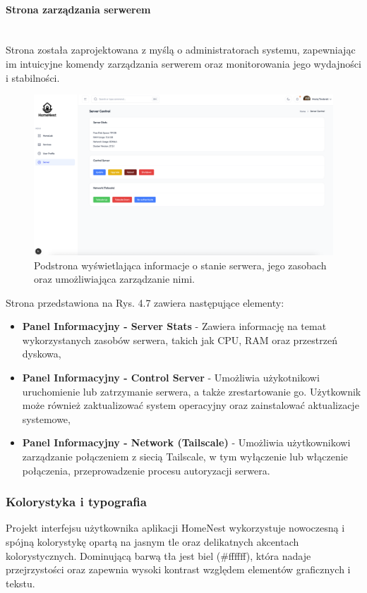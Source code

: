 \paragraph{Strona zarządzania serwerem}\mbox{}\\

Strona została zaprojektowana z myślą o administratorach systemu, zapewniając im intuicyjne komendy zarządzania serwerem oraz monitorowania jego wydajności i stabilności.

\begin{figure}[H]
  \centering
  \includegraphics[width=1\textwidth]{./chapters/assets/server_page.png}
  \caption{Podstrona wyświetlająca informacje o stanie serwera, jego zasobach oraz umożliwiająca zarządzanie nimi.}
  \label{fig:ui_server_page}
\end{figure}
\noindent Strona przedstawiona na Rys. 4.7 zawiera następujące elementy:
\begin{itemize}
  \item \textbf{Panel Informacyjny -  Server Stats} - Zawiera informację na temat wykorzystanych zasobów serwera, takich jak CPU, RAM oraz przestrzeń dyskowa,
  \item \textbf{Panel Informacyjny -  Control Server} - Umożliwia użykotnikowi uruchomienie lub zatrzymanie serwera, a także zrestartowanie go. Użytkownik może również zaktualizować system operacyjny oraz zainstalować aktualizacje systemowe,
  \item \textbf{Panel Informacyjny -  Network (Tailscale\cite{Tailscale})} - Umożliwia użytkownikowi zarządzanie połączeniem z siecią Tailscale, w tym wyłączenie lub włączenie połączenia, przeprowadzenie procesu autoryzacji serwera.
\end{itemize}
\subsubsection{Kolorystyka i typografia}
Projekt interfejsu użytkownika aplikacji HomeNest wykorzystuje nowoczesną i spójną kolorystykę opartą na jasnym tle oraz delikatnych akcentach kolorystycznych. Dominującą barwą tła jest biel (\#ffffff), która nadaje przejrzystości oraz zapewnia wysoki kontrast względem elementów graficznych i tekstu.

